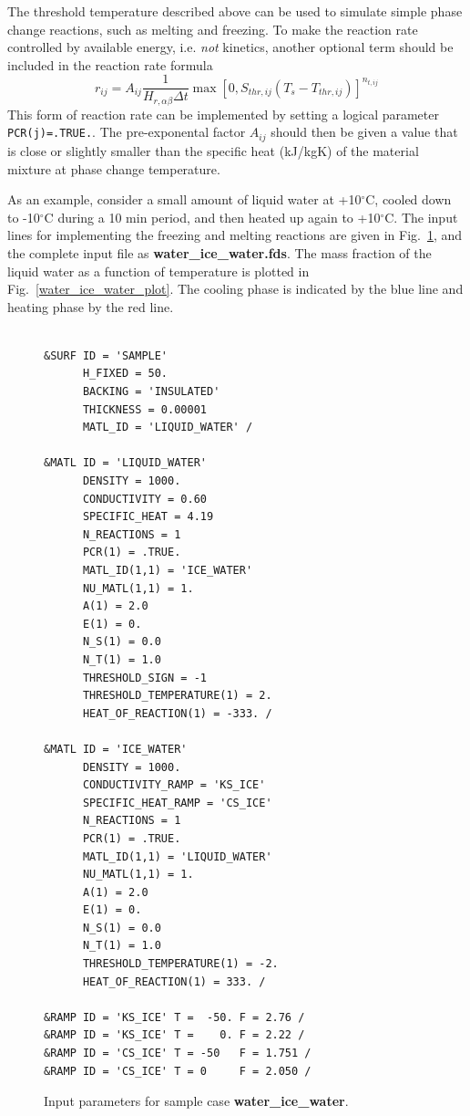 \documentclass[11pt]{book}
\newcommand{\ct}{\tt\small}
\newcommand{\be}{\begin{equation}}
\newcommand{\ee}{\end{equation}}
\begin{document}
The threshold temperature described above can be used to simulate simple phase change reactions, such as melting and freezing.
To make the reaction rate controlled by available energy, i.e. {\em not} kinetics, another optional term should be included
in the reaction rate formula
\be
  r_{ij} = A_{ij}\frac{1}{H_{r,\alpha\beta}\Delta t} \max\left[0,S_{thr,ij}(T_s-T_{thr,ij})\right]^{n_{t,ij}}
  \label{rr3}
\ee
This form of reaction rate can be implemented by setting a logical parameter {\ct PCR(j)=.TRUE.}. The pre-exponental
factor $A_{ij}$ should then be given a value that is close or slightly smaller than the specific heat (kJ/kgK) of the material mixture at
phase change temperature.

As an example, consider a small amount of liquid water at +10${}^\circ$C, cooled down to -10${}^\circ$C during a 10 min period, and
then heated up again to +10${}^\circ$C. The input lines for implementing the freezing and melting reactions are given in Fig.~\ref{water_ice_water_inputs},
and the complete input file as {\bf water\_ice\_water.fds}.
The mass fraction of the liquid water as a function of temperature is plotted in Fig.~\ref{water_ice_water_plot}. The cooling phase is indicated by
the blue line and heating phase by the red line.
\begin{figure}[ht]
\begin{center}
\begin{minipage}{4in}
\footnotesize
\begin{verbatim}

&SURF ID = 'SAMPLE'
      H_FIXED = 50.
      BACKING = 'INSULATED'
      THICKNESS = 0.00001
      MATL_ID = 'LIQUID_WATER' /

&MATL ID = 'LIQUID_WATER'
      DENSITY = 1000.
      CONDUCTIVITY = 0.60
      SPECIFIC_HEAT = 4.19
      N_REACTIONS = 1
      PCR(1) = .TRUE.
      MATL_ID(1,1) = 'ICE_WATER'
      NU_MATL(1,1) = 1.
      A(1) = 2.0
      E(1) = 0.
      N_S(1) = 0.0
      N_T(1) = 1.0
      THRESHOLD_SIGN = -1
      THRESHOLD_TEMPERATURE(1) = 2.
      HEAT_OF_REACTION(1) = -333. /

&MATL ID = 'ICE_WATER'
      DENSITY = 1000.
      CONDUCTIVITY_RAMP = 'KS_ICE'
      SPECIFIC_HEAT_RAMP = 'CS_ICE'
      N_REACTIONS = 1
      PCR(1) = .TRUE.
      MATL_ID(1,1) = 'LIQUID_WATER'
      NU_MATL(1,1) = 1.
      A(1) = 2.0
      E(1) = 0.
      N_S(1) = 0.0
      N_T(1) = 1.0
      THRESHOLD_TEMPERATURE(1) = -2.
      HEAT_OF_REACTION(1) = 333. /

&RAMP ID = 'KS_ICE' T =  -50. F = 2.76 /
&RAMP ID = 'KS_ICE' T =    0. F = 2.22 /
&RAMP ID = 'CS_ICE' T = -50   F = 1.751 /
&RAMP ID = 'CS_ICE' T = 0     F = 2.050 /
\end{verbatim} \normalsize
\end{minipage}
\end{center}
\caption[Input parameters for sample case {\bf water\_ice\_water}.]{Input parameters for sample case {\bf water\_ice\_water}.}
\label{water_ice_water_inputs}
\end{figure}
\end{document}
